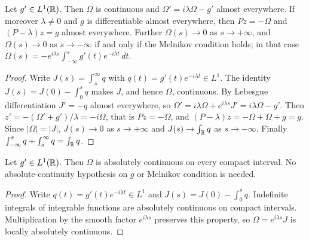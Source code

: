\begin{lemma}
\label{lem:canonical-profile-ode}
\leanok
Let $g'\in L^1(\mathbb{R})$. Then $\Omega$ is continuous and
$\Omega'=i\lambda\Omega-g'$ almost everywhere. If moreover
$\lambda\ne0$ and $g$ is differentiable almost everywhere, then $Pz=-\Omega$ and
$(P-\lambda)z=g$ almost everywhere. Further $\Omega(s)\to0$ as $s\to+\infty$, and
$\Omega(s)\to0$ as $s\to-\infty$ if and only if the Melnikov condition holds; in that
case $\Omega(s)=-e^{i\lambda s}\int_{-\infty}^sg'(t)e^{-i\lambda t}\,dt$.
\end{lemma}

\begin{proof}
\leanok
Write $J(s)=\int_s^\infty q$ with $q(t)=g'(t)e^{-i\lambda t}\in L^1$. The identity
$J(s)=J(0)-\int_0^sq$ makes $J$, and hence $\Omega$, continuous. By Lebesgue
differentiation $J'=-q$ almost everywhere, so
$\Omega'=i\lambda\Omega+e^{i\lambda s}J'=i\lambda\Omega-g'$. Then
$z'=-(\Omega'+g')/\lambda=-i\Omega$, that is $Pz=-\Omega$, and
$(P-\lambda)z=-\Omega+\Omega+g=g$. Since $|\Omega|=|J|$, $J(s)\to0$ as $s\to+\infty$
and $J(s)\to\int_{\mathbb{R}} q$ as $s\to-\infty$. Finally
$\int_{-\infty}^sq+\int_s^\infty q=\int_{\mathbb{R}} q$.
\end{proof}

\begin{lemma}
\label{lem:canonical-profile-ac}
\leanok
Let $g'\in L^1(\mathbb{R})$. Then $\Omega$ is absolutely continuous on every compact
interval. No absolute-continuity hypothesis on $g$ or Melnikov condition is needed.
\end{lemma}

\begin{proof}
\leanok
Write $q(t)=g'(t)e^{-i\lambda t}\in L^1$ and
$J(s)=J(0)-\int_0^s q$. Indefinite integrals of integrable functions are
absolutely continuous on compact intervals. Multiplication by the smooth
factor $e^{i\lambda s}$ preserves this property, so $\Omega=e^{i\lambda s}J$
is locally absolutely continuous.
\end{proof}


